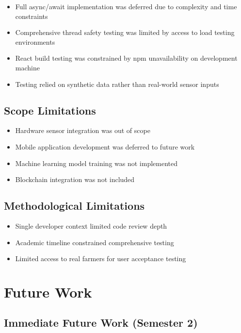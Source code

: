 \begin{itemize}
    \item Full async/await implementation was deferred due to complexity and time constraints
    \item Comprehensive thread safety testing was limited by access to load testing environments
    \item React build testing was constrained by npm unavailability on development machine
    \item Testing relied on synthetic data rather than real-world sensor inputs
\end{itemize}

\subsection{Scope Limitations}

\begin{itemize}
    \item Hardware sensor integration was out of scope
    \item Mobile application development was deferred to future work
    \item Machine learning model training was not implemented
    \item Blockchain integration was not included
\end{itemize}

\subsection{Methodological Limitations}

\begin{itemize}
    \item Single developer context limited code review depth
    \item Academic timeline constrained comprehensive testing
    \item Limited access to real farmers for user acceptance testing
\end{itemize}

\section{Future Work}

\subsection{Immediate Future Work (Semester 2)}

